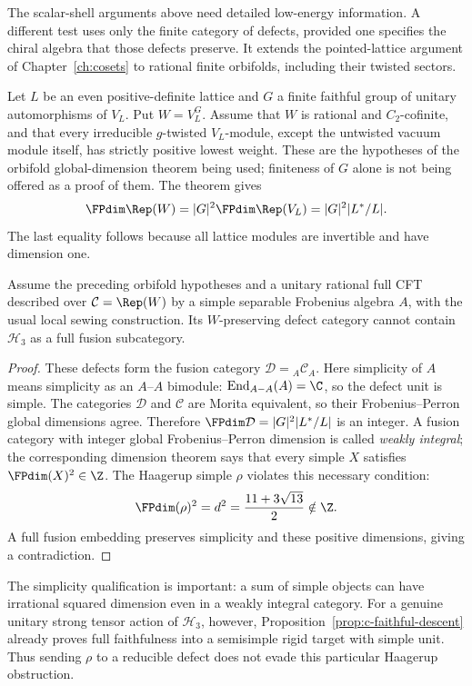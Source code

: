 The scalar-shell arguments above need detailed low-energy information.
A different test uses only the finite category of defects, provided one
specifies the chiral algebra that those defects preserve. It extends the
pointed-lattice argument of Chapter~\ref{ch:cosets} to rational finite
orbifolds, including their twisted sectors.

Let $L$ be an even positive-definite lattice and $G$ a finite faithful
group of unitary automorphisms of $V_L$. Put $W=V_L^G$. Assume that $W$
is rational and $C_2$-cofinite, and that every irreducible $g$-twisted
$V_L$-module, except the untwisted vacuum module itself, has strictly
positive lowest weight. These are the hypotheses of the orbifold
global-dimension theorem being used; finiteness of $G$ alone is not
being offered as a proof of them. The theorem gives
\[
 \FPdim\Rep(W)=|G|^2\FPdim\Rep(V_L)=|G|^2|L^*/L|.
\]
The last equality follows because all lattice modules are invertible
and have dimension one.

\begin{proposition}
\label{prop:rational-orbifold-Haagerup}
Assume the preceding orbifold hypotheses and a unitary rational full
CFT described over $\mathcal C=\Rep(W)$ by a simple separable Frobenius
algebra $A$, with the usual local sewing construction. Its
$W$-preserving defect category cannot contain $\mathcal H_3$ as a
full fusion subcategory.
\end{proposition}
\begin{proof}
These defects form the fusion category
$\mathcal D={}_A\mathcal C_A$. Here simplicity of $A$ means
simplicity as an $A$--$A$ bimodule:
$\operatorname{End}_{A-A}(A)=\C$, so the defect unit is simple.
The categories $\mathcal D$ and $\mathcal C$ are Morita equivalent,
so their Frobenius--Perron global dimensions agree. Therefore
$\FPdim\mathcal D=|G|^2|L^*/L|$ is an integer. A fusion category with
integer global Frobenius--Perron dimension is called
\emph{weakly integral}; the corresponding dimension theorem says
that every simple $X$ satisfies $\FPdim(X)^2\in\Z$.
The Haagerup simple $\rho$ violates this necessary condition:
\[
 \FPdim(\rho)^2=d^2=\frac{11+3\sqrt{13}}2\notin\Z.
\]
A full fusion embedding preserves simplicity and these positive
dimensions, giving a contradiction.
\end{proof}

The simplicity qualification is important: a sum of simple objects can
have irrational squared dimension even in a weakly integral category.
For a genuine unitary strong tensor action of $\mathcal H_3$, however,
Proposition~\ref{prop:c-faithful-descent} already proves full
faithfulness into a semisimple rigid target with simple unit. Thus
sending $\rho$ to a reducible defect does not evade this particular
Haagerup obstruction.

